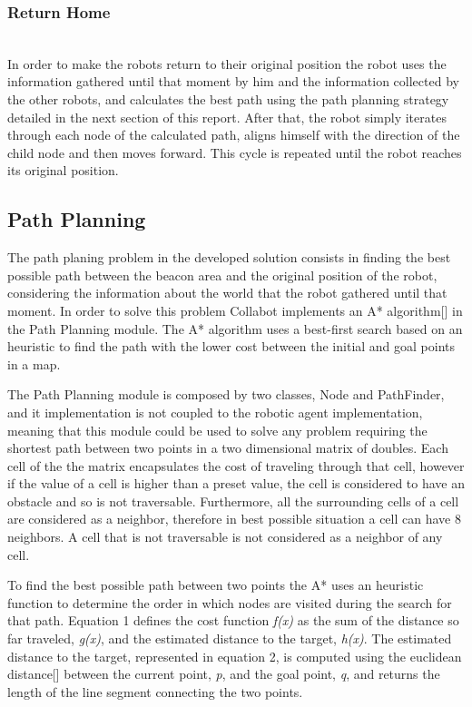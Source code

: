 \documentclass[oribibl]{llncs}
\begin{document}
\subsubsection{Return Home}\hfill \\

In order to make the robots return to their original position the robot uses the information gathered until that moment by him and the information collected by the other robots, and calculates the best path using the path planning strategy detailed in the next section of this report. After that, the robot simply iterates through each node of the calculated path, aligns himself with the direction of the child node and then moves forward. This cycle is repeated until the robot reaches its original position.

\subsection{Path Planning}

The path planing problem in the developed solution consists in finding the best possible path between the beacon area and the original position of the robot, considering the information about the world that the robot gathered until that moment. In order to solve this problem Collabot implements an A* algorithm[] in the Path Planning module. The A* algorithm uses a best-first search based on an heuristic to find the path with the lower cost between the initial and goal points in a map.

The Path Planning module is composed by two classes, Node and PathFinder, and it implementation is not coupled to the robotic agent implementation, meaning that this module could be used to solve any problem requiring the shortest path between two points in a two dimensional matrix of doubles. Each cell of the the matrix encapsulates the cost of traveling through that cell, however if the value of a cell is higher than a preset value, the cell is considered to have an obstacle and so is not traversable. Furthermore, all the surrounding cells of a cell are considered as a neighbor, therefore in best possible situation a cell can have 8 neighbors. A cell that is not traversable is not considered as a neighbor of any cell.

To find the best possible path between two points the A* uses an heuristic function to determine the order in which nodes are visited during the search for that path. Equation 1 defines the cost function \textit{f(x)} as the sum of the distance so far traveled, \textit{g(x)}, and the estimated distance to the target, \textit{h(x)}. The estimated distance to the target, represented in equation 2, is computed using the euclidean distance[] between the current point, \textit{p}, and the goal point, \textit{q}, and returns the length of the line segment connecting the two points.
\end{document}
